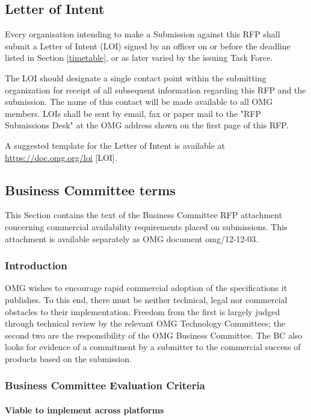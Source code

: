 \subsection{Letter of Intent}

Every organisation intending to make a Submission against this RFP shall submit a Letter of Intent (LOI) signed by an officer on or before the deadline listed in Section \ref{timetable}, or as later varied by the issuing Task Force.

The LOI should designate a single contact point within the submitting organization for receipt of all subsequent information regarding this RFP and the submission. The name of this contact will be made available to all OMG members. LOIs shall be sent by email, fax or paper mail to the "RFP Submissions Desk" at the OMG address shown on the first page of this RFP.

A suggested template for the Letter of Intent is available at \url{https://doc.omg.org/loi} [LOI].


\subsection{Business Committee terms}

This Section contains the text of the Business Committee RFP attachment concerning commercial availability requirements placed on submissions. This attachment is available separately as OMG document omg/12-12-03.


\subsubsection{Introduction}

OMG wishes to encourage rapid commercial adoption of the specifications it publishes. To this end, there must be neither technical, legal nor commercial obstacles to their implementation. Freedom from the first is largely judged through technical review by the relevant OMG Technology Committees; the second two are the responsibility of the OMG Business Committee. The BC also looks for evidence of a commitment by a submitter to the commercial success of products based on the submission.


\subsubsection{Business Committee Evaluation Criteria}
\paragraph{Viable to implement across platforms}

